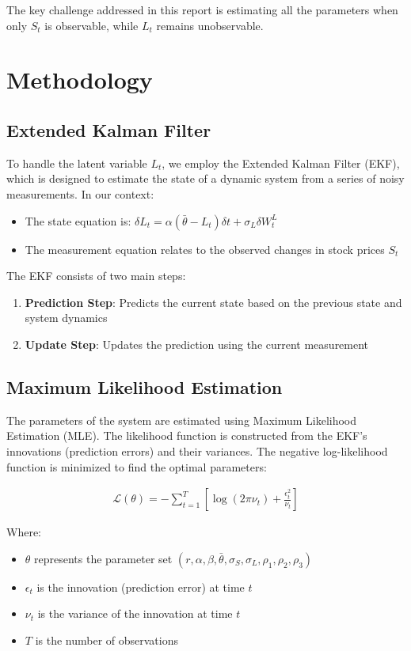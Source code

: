 \documentclass[12pt,a4paper]{article}
\begin{document}
The key challenge addressed in this report is estimating all the parameters when only $S_t$ is observable, while $L_t$ remains unobservable.

\section{Methodology}

\subsection{Extended Kalman Filter}

To handle the latent variable $L_t$, we employ the Extended Kalman Filter (EKF), which is designed to estimate the state of a dynamic system from a series of noisy measurements. In our context:

\begin{itemize}
    \item The state equation is: $\delta L_t = \alpha (\bar{\theta} - L_t) \delta t + \sigma_L \delta W_t^L$
    \item The measurement equation relates to the observed changes in stock prices $S_t$
\end{itemize}

The EKF consists of two main steps:
\begin{enumerate}
    \item \textbf{Prediction Step}: Predicts the current state based on the previous state and system dynamics
    \item \textbf{Update Step}: Updates the prediction using the current measurement
\end{enumerate}

\subsection{Maximum Likelihood Estimation}

The parameters of the system are estimated using Maximum Likelihood Estimation (MLE). The likelihood function is constructed from the EKF's innovations (prediction errors) and their variances. The negative log-likelihood function is minimized to find the optimal parameters:

\begin{align}
    \mathcal{L}(\theta) = -\sum_{t=1}^{T} \left[ \log(2\pi \nu_t) + \frac{\epsilon_t^2}{\nu_t} \right]
\end{align}

Where:
\begin{itemize}
    \item $\theta$ represents the parameter set $(r, \alpha, \beta, \bar{\theta}, \sigma_S, \sigma_L, \rho_1, \rho_2, \rho_3)$
    \item $\epsilon_t$ is the innovation (prediction error) at time $t$
    \item $\nu_t$ is the variance of the innovation at time $t$
    \item $T$ is the number of observations
\end{itemize}
\end{document}
